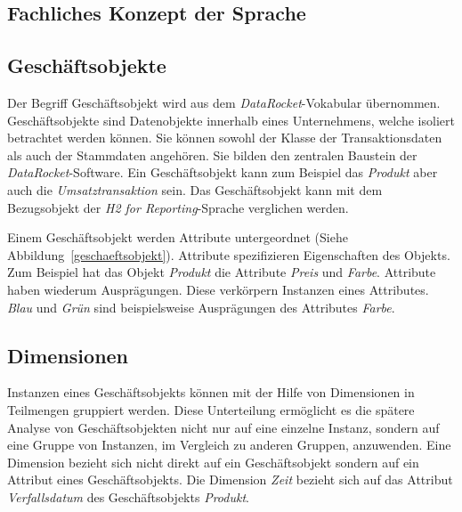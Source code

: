 \documentclass[
  language=german, %
  type=bachelor%
]{isthesis}
\begin{document}
\begin{content}
  \section{Fachliches Konzept der Sprache}
  \begin{figure}[caption={Metamodell der DataFurnace-Sprache}, label={fig:img01}]
    \resizebox{\columnwidth}{!}{}
  \end{figure}

  \subsection{Geschäftsobjekte}
  Der Begriff Geschäftsobjekt wird aus dem \textit{DataRocket}-Vokabular
  übernommen. Geschäftsobjekte sind Datenobjekte innerhalb eines Unternehmens,
  welche isoliert betrachtet werden können. Sie können sowohl der Klasse der
  Transaktionsdaten als auch der Stammdaten angehören. Sie bilden den zentralen
  Baustein der \textit{DataRocket}-Software. Ein Geschäftsobjekt kann zum
  Beispiel das \textit{Produkt} aber auch die \textit{Umsatztransaktion} sein.
  Das Geschäftsobjekt kann mit dem Bezugsobjekt der \textit{H2 for
  Reporting}-Sprache verglichen werden. 

  \begin{figure}[caption={Teilsprache---Geschäftsobjekt}, label={geschaeftsobjekt}]
    \resizebox{200px}{!}{}
  \end{figure}

  Einem Geschäftsobjekt werden Attribute untergeordnet (Siehe
  Abbildung~\ref{geschaeftsobjekt}). Attribute spezifizieren Eigenschaften des
  Objekts. Zum Beispiel hat das Objekt \textit{Produkt} die Attribute
  \textit{Preis} und \textit{Farbe}. Attribute haben wiederum Ausprägungen.
  Diese verkörpern Instanzen eines Attributes. \textit{Blau} und \textit{Grün}
  sind beispielsweise Ausprägungen des Attributes \textit{Farbe}.
  
  \subsection{Dimensionen}
  Instanzen eines Geschäftsobjekts können mit der Hilfe von Dimensionen in
  Teilmengen gruppiert werden. Diese Unterteilung ermöglicht es die spätere
  Analyse von Geschäftsobjekten nicht nur auf eine einzelne Instanz, sondern auf
  eine Gruppe von Instanzen, \ggf{} im Vergleich zu anderen Gruppen,
  anzuwenden.  Eine Dimension bezieht sich nicht direkt auf ein Geschäftsobjekt
  sondern auf ein Attribut eines Geschäftsobjekts. Die Dimension \textit{Zeit}
  bezieht sich \zB{} auf das Attribut \textit{Verfallsdatum} des
  Geschäftsobjekts \textit{Produkt}. 


\end{content}
\end{document}
